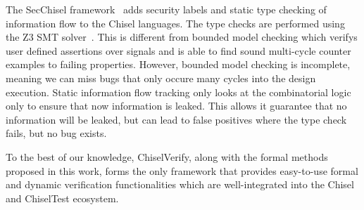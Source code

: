 \documentclass[conference]{IEEEtran}
\begin{document}

The SecChisel framework~\cite{deng2019secchisel} adds security labels and
static type checking of information flow to the Chisel languages.
The type checks are performed using the Z3 SMT solver~\cite{de2008z3}.
This is different from bounded model checking which verifys user defined
assertions over signals and is able to find sound multi-cycle counter examples
to failing properties. However, bounded model checking is incomplete,
meaning we can miss bugs that only occure many cycles into the design execution.
Static information flow tracking only looks at the combinatorial logic
only to ensure that now information is leaked.
This allows it guarantee that no information will be leaked, but can lead to
false positives where the type check fails, but no bug exists.

To the best of our knowledge, ChiselVerify, along with the formal methods proposed in this work, forms the only framework that provides easy-to-use formal and dynamic verification functionalities which are well-integrated into the Chisel and ChiselTest ecosystem.
\end{document}
